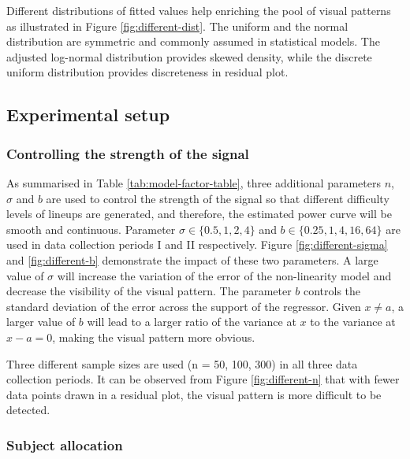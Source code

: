 \documentclass[]{interact}
\theoremstyle{plain}%
\theoremstyle{definition}
\theoremstyle{remark}
\begin{document}
Different distributions of fitted values help enriching the pool of
visual patterns as illustrated in Figure \ref{fig:different-dist}. The
uniform and the normal distribution are symmetric and commonly assumed
in statistical models. The adjusted log-normal distribution provides
skewed density, while the discrete uniform distribution provides
discreteness in residual plot.

\hypertarget{experimental-setup}{%
\subsection{Experimental setup}\label{experimental-setup}}

\hypertarget{controlling-the-strength-of-the-signal}{%
\subsubsection{Controlling the strength of the
signal}\label{controlling-the-strength-of-the-signal}}

As summarised in Table \ref{tab:model-factor-table}, three additional
parameters \(n\), \(\sigma\) and \(b\) are used to control the strength
of the signal so that different difficulty levels of lineups are
generated, and therefore, the estimated power curve will be smooth and
continuous. Parameter \(\sigma \in \{0.5, 1, 2, 4\}\) and
\(b \in \{0.25, 1, 4, 16, 64\}\) are used in data collection periods I
and II respectively. Figure \ref{fig:different-sigma} and
\ref{fig:different-b} demonstrate the impact of these two parameters. A
large value of \(\sigma\) will increase the variation of the error of
the non-linearity model and decrease the visibility of the visual
pattern. The parameter \(b\) controls the standard deviation of the
error across the support of the regressor. Given \(x \neq a\), a larger
value of \(b\) will lead to a larger ratio of the variance at \(x\) to
the variance at \(x - a = 0\), making the visual pattern more obvious.

Three different sample sizes are used (n = 50, 100, 300) in all three
data collection periods. It can be observed from Figure
\ref{fig:different-n} that with fewer data points drawn in a residual
plot, the visual pattern is more difficult to be detected.

\hypertarget{subject-allocation}{%
\subsubsection{Subject allocation}\label{subject-allocation}}
\end{document}
